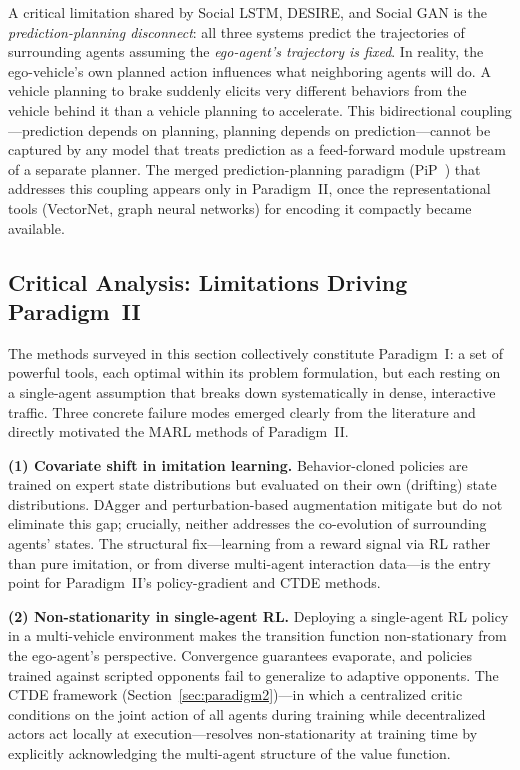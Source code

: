 \documentclass[12pt, a4paper]{article}
\begin{document}
A critical limitation shared by Social LSTM, DESIRE, and Social GAN is the
\emph{prediction-planning disconnect}: all three systems predict the
trajectories of surrounding agents assuming the \emph{ego-agent's trajectory
is fixed}.  In reality, the ego-vehicle's own planned action influences
what neighboring agents will do.  A vehicle planning to brake suddenly
elicits very different behaviors from the vehicle behind it than a vehicle
planning to accelerate.  This bidirectional coupling---prediction depends on
planning, planning depends on prediction---cannot be captured by any model
that treats prediction as a feed-forward module upstream of a separate planner.
The merged prediction-planning paradigm (PiP~\cite{song2020pip}) that addresses
this coupling appears only in Paradigm~II, once the representational tools
(VectorNet, graph neural networks) for encoding it compactly became available.

\subsection{Critical Analysis: Limitations Driving Paradigm~II}
\label{sec:paradigm1_limits}

The methods surveyed in this section collectively constitute Paradigm~I:
a set of powerful tools, each optimal within its problem formulation, but
each resting on a single-agent assumption that breaks down systematically
in dense, interactive traffic.  Three concrete failure modes emerged clearly
from the literature and directly motivated the MARL methods of Paradigm~II.

\textbf{(1) Covariate shift in imitation learning.}
Behavior-cloned policies are trained on expert state distributions but
evaluated on their own (drifting) state distributions.  DAgger and
perturbation-based augmentation mitigate but do not eliminate this gap;
crucially, neither addresses the co-evolution of surrounding agents'
states.  The structural fix---learning from a reward signal via RL rather
than pure imitation, or from diverse multi-agent interaction data---is the
entry point for Paradigm~II's policy-gradient and CTDE methods.

\textbf{(2) Non-stationarity in single-agent RL.}
Deploying a single-agent RL policy in a multi-vehicle environment makes
the transition function non-stationary from the ego-agent's perspective.
Convergence guarantees evaporate, and policies trained against scripted
opponents fail to generalize to adaptive opponents.  The CTDE framework
(Section~\ref{sec:paradigm2})---in which a centralized critic conditions
on the joint action of all agents during training while decentralized
actors act locally at execution---resolves non-stationarity at training
time by explicitly acknowledging the multi-agent structure of the value
function.
\end{document}
